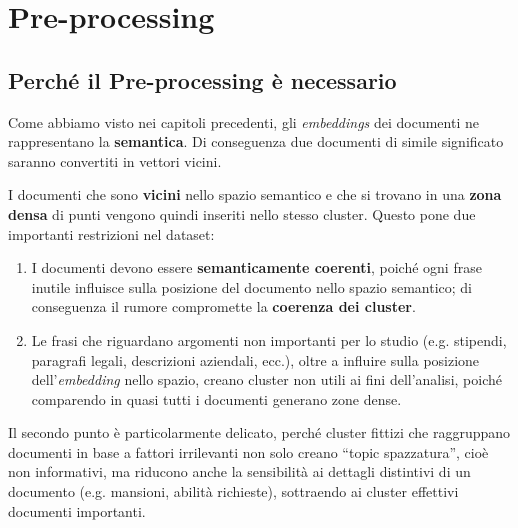 
\newcommand{\legenditem}[2]{\textcolor{#2}{\rule{0.8em}{0.8em}}\hspace{0.5em}\textbf{#1}}

\chapter{Pre-processing}
\section{Perché il Pre-processing è necessario}

Come abbiamo visto nei capitoli precedenti, gli \textit{embeddings} dei documenti ne rappresentano la \textbf{semantica}. Di conseguenza due documenti di simile significato saranno convertiti in vettori vicini.

I documenti che sono \textbf{vicini} nello spazio semantico e che si trovano in una \textbf{zona densa} di punti vengono quindi inseriti nello stesso cluster. Questo pone due importanti restrizioni nel dataset:

\begin{enumerate}
    \item I documenti devono essere \textbf{semanticamente coerenti}, poiché ogni frase inutile influisce sulla posizione del documento nello spazio semantico; di conseguenza il rumore compromette la \textbf{coerenza dei cluster}.
    \item Le frasi che riguardano argomenti non importanti per lo studio (e.g. stipendi, paragrafi legali, descrizioni aziendali, ecc.), oltre a influire sulla posizione dell'\textit{embedding} nello spazio, creano cluster non utili ai fini dell'analisi, poiché comparendo in quasi tutti i documenti generano zone dense.
\end{enumerate}

Il secondo punto è particolarmente delicato, perché cluster fittizi che raggruppano documenti in base a fattori irrilevanti non solo creano ``topic spazzatura'', cioè non informativi, ma riducono anche la sensibilità ai dettagli distintivi di un documento (e.g. mansioni, abilità richieste), sottraendo ai cluster effettivi documenti importanti.

